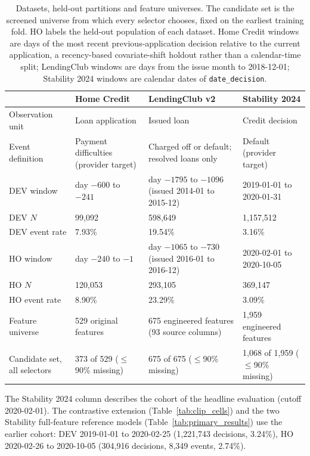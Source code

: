 \documentclass[final,5p,twocolumn]{elsarticle}
\begin{document}
\begin{table}[htbp]
\centering
\footnotesize
\begin{threeparttable}
\caption{Datasets, held-out partitions and feature universes. The candidate set is the screened universe from which every selector chooses, fixed on the earliest training fold. HO labels the held-out population of each dataset. Home Credit windows are days of the most recent previous-application decision relative to the current application, a recency-based covariate-shift holdout rather than a calendar-time split; LendingClub windows are days from the issue month to 2018-12-01; Stability 2024 windows are calendar dates of \texttt{date\_decision}.}
\label{tab:datasets}
\begin{tabular}{@{}lL{29mm}L{31mm}L{31mm}@{}}
\toprule
 & Home Credit & LendingClub v2 & Stability 2024 \\
\midrule
Observation unit & Loan application & Issued loan & Credit decision \\
Event definition & Payment difficulties (provider target) & Charged off or default; resolved loans only & Default (provider target) \\
DEV window & day $-600$ to $-241$ & day $-1795$ to $-1096$ (issued 2014-01 to 2015-12) & 2019-01-01 to 2020-01-31 \\
DEV $N$ & 99,092 & 598,649 & 1,157,512 \\
DEV event rate & 7.93\% & 19.54\% & 3.16\% \\
HO window & day $-240$ to $-1$ & day $-1065$ to $-730$ (issued 2016-01 to 2016-12) & 2020-02-01 to 2020-10-05 \\
HO $N$ & 120,053 & 293,105 & 369,147 \\
HO event rate & 8.90\% & 23.29\% & 3.09\% \\
Feature universe & 529 original features & 675 engineered features (93 source columns) & 1,959 engineered features \\
Candidate set, all selectors & 373 of 529 ($\le$90\% missing) & 675 of 675 ($\le$90\% missing) & 1,068 of 1,959 ($\le$90\% missing) \\
\bottomrule
\end{tabular}
\begin{tablenotes}\footnotesize
\item The Stability 2024 column describes the cohort of the headline evaluation (cutoff 2020-02-01). The contrastive extension (Table~\ref{tab:clip_cells}) and the two Stability full-feature reference models (Table~\ref{tab:primary_results}) use the earlier cohort: DEV 2019-01-01 to 2020-02-25 (1,221,743 decisions, 3.24\%), HO 2020-02-26 to 2020-10-05 (304,916 decisions, 8,349 events, 2.74\%).
\end{tablenotes}
\end{threeparttable}
\end{table}
\end{document}
